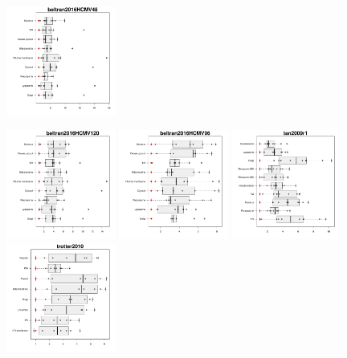 \documentclass[12pt]{article}\usepackage[]{graphicx}\usepackage[]{color}
\begin{document}
\begin{appendices}
\begin{figure}[htb]
  \includegraphics[width = 0.32\textwidth]{./figure/allqseps-12.pdf}
\end{figure}
\begin{figure}[htb]\ContinuedFloat
  \includegraphics[width = 0.32\textwidth]{./figure/allqseps-13.pdf}
  \includegraphics[width = 0.32\textwidth]{./figure/allqseps-14.pdf}
  \includegraphics[width = 0.32\textwidth]{./figure/allqseps-15.pdf}
  \includegraphics[width = 0.32\textwidth]{./figure/allqseps-16.pdf}

\end{figure}
\end{appendices}
\end{document}

